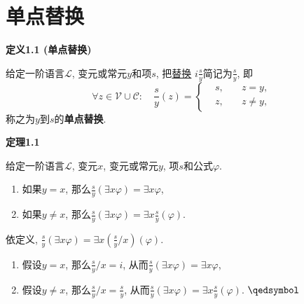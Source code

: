 


\setlength{\abovedisplayskip}{1pt}
\setlength{\belowdisplayskip}{1pt}

\section{单点替换}

\hypertarget{sec:定义1.1}{}
\noindent\textbf{定义1.1 (单点替换)}

给定一阶语言$\mathcal{L}$, 变元或常元$y$和项$s$,
把\href{04 一般替换#nameddest=sec:定义1.1}{替换}
$\displaystyle i\frac{s}{y}$简记为$\displaystyle\frac{s}{y}$, 即
\[\forall z\in\mathcal{V}\cup\mathcal{C}:\quad\frac{s}{y}(z)=
\left\{\begin{aligned}
    &s,\quad&z=y,\\[-3pt]
    &z,\quad&z\neq y,
\end{aligned}\right.\]
称之为$y$到$s$的\textbf{单点替换}.

\vspace{10pt}

\hypertarget{sec:定理1.1}{}
\noindent\textbf{定理1.1}

给定一阶语言$\mathcal{L}$, 变元$x$, 变元或常元$y$, 项$s$和公式$\varphi$.
\vspace{3pt}
\begin{enumerate}
    \item 如果$y=x$, 那么$\displaystyle
    \frac{s}{y}(\exists x\varphi)=\exists x\varphi$,
    \vspace{6pt}
    \item 如果$y\neq x$, 那么$\displaystyle
    \frac{s}{y}(\exists x\varphi)=\exists x\frac{s}{y}(\varphi)$.
\end{enumerate}


依定义, $\displaystyle\frac{s}{y}(\exists x\varphi)=
\exists x\left(\frac{s}{y}/x\right)(\varphi)$.

\vspace{3pt}
\begin{enumerate}
    \item 假设$y=x$, 那么$\displaystyle\frac{s}{y}/x=i$,
    从而$\displaystyle\frac{s}{y}(\exists x\varphi)=\exists x\varphi$,
    \vspace{6pt}
    \item 假设$y\neq x$, 那么$\displaystyle\frac{s}{y}/x=\frac{s}{y}$,
    从而$\displaystyle\frac{s}{y}(\exists x\varphi)=\exists x\frac{s}{y}(\varphi)$.
    \hfill $\qedsymbol$
\end{enumerate}

